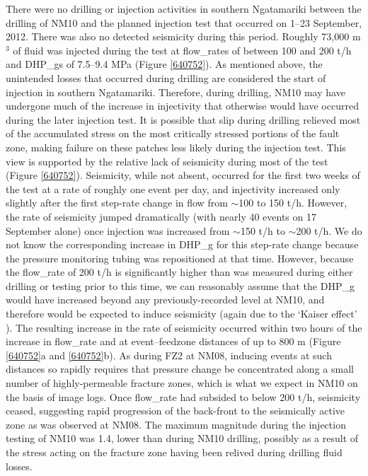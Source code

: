 There were no drilling or injection activities in southern Ngatamariki between the drilling of NM10 and the planned injection test that occurred on 1--23 September, 2012. There was also no detected seismicity during this period. Roughly 73,000 m$^3$ of fluid was injected during the test at \glspl{flow_rate} of between 100 and 200 t/h and \glspl{DHP_g} of 7.5--9.4 MPa (Figure \ref{640752}). As mentioned above, the unintended losses that occurred during drilling are considered the start of injection in southern Ngatamariki. Therefore, during drilling, NM10 may have undergone much of the increase in \gls{injectivity} that otherwise would have occurred during the later injection test. It is possible that slip during drilling relieved most of the accumulated stress on the most critically stressed portions of the fault zone, making failure on these patches less likely during the injection test. This view is supported by the relative lack of seismicity during most of the test (Figure \ref{640752}). Seismicity, while not absent, occurred for the first two weeks of the test at a rate of roughly one event per day, and \gls{injectivity} increased only slightly after the first step-rate change in flow from $\sim$100 to 150 t/h. However, the rate of seismicity jumped dramatically (with nearly 40 events on 17 September alone) once injection was increased from $\sim$150 t/h to $\sim$200 t/h. We do not know the corresponding increase in \gls{DHP_g} for this step-rate change because the pressure monitoring tubing was repositioned at that time. However, because the \gls{flow_rate} of 200 t/h is significantly higher than was measured during either drilling or testing prior to this time, we can reasonably assume that the \gls{DHP_g} would have increased beyond any previously-recorded level at NM10, and therefore would be expected to induce seismicity (again due to the `Kaiser effect' \citep{Holcomb_1993}). The resulting increase in the rate of seismicity occurred within two hours of the increase in \gls{flow_rate} and at event--\gls{feedzone} distances of up to 800 m (Figure \ref{640752}a and \ref{640752}b). As during FZ2 at NM08, inducing events at such distances so rapidly requires that pressure change be concentrated along a small number of highly-permeable fracture zones, which is what we expect in NM10 on the basis of image logs. Once \gls{flow_rate} had subsided to below 200 t/h, seismicity ceased, suggesting rapid progression of the back-front to the seismically active zone as was observed at NM08. The maximum magnitude during the injection testing of NM10 was 1.4, lower than during NM10 drilling, possibly as a result of the stress acting on the fracture zone having been relived during drilling fluid losses.

